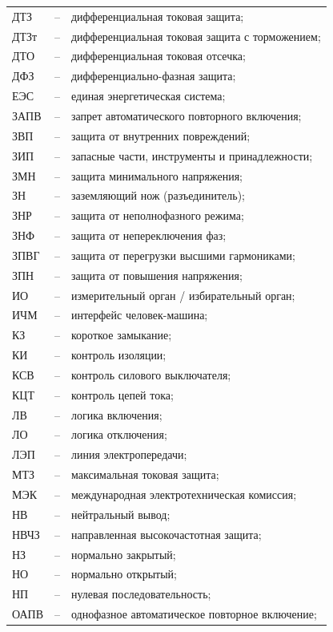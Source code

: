 \begin{longtable}{>{\raggedright\arraybackslash}m{2cm}>{\raggedright\arraybackslash}m{0.5cm}>{\raggedright\arraybackslash}m{20cm}}
ДТЗ & -- & дифференциальная токовая защита; \\
ДТЗт & -- & дифференциальная токовая защита с торможением; \\
ДТО & -- & дифференциальная токовая отсечка; \\
ДФЗ & -- & дифференциально-фазная защита; \\
ЕЭС & -- & единая энергетическая система; \\
ЗАПВ & -- & запрет автоматического повторного включения; \\
ЗВП & -- & защита от внутренних повреждений; \\
ЗИП & -- & запасные части, инструменты и принадлежности; \\
ЗМН & -- & защита минимального напряжения; \\
ЗН & -- & заземляющий нож (разъединитель); \\
ЗНР & -- & защита от неполнофазного режима; \\
ЗНФ & -- & защита от непереключения фаз; \\
ЗПВГ & -- & защита от перегрузки высшими гармониками; \\
ЗПН & -- & защита от повышения напряжения; \\
ИО & -- & измерительный орган / избирательный орган; \\
ИЧМ & -- & интерфейс человек-машина; \\
КЗ & -- & короткое замыкание; \\
КИ & -- & контроль изоляции; \\
КСВ & -- & контроль силового выключателя; \\
КЦТ & -- & контроль цепей тока; \\
ЛВ & -- & логика включения; \\
ЛО & -- & логика отключения; \\
ЛЭП & -- & линия электропередачи; \\
МТЗ & -- & максимальная токовая защита; \\
МЭК & -- & международная электротехническая комиссия; \\
НВ & -- & нейтральный вывод; \\
НВЧЗ & -- & направленная высокочастотная защита; \\
НЗ & -- & нормально закрытый; \\
НО & -- & нормально открытый; \\
НП & -- & нулевая последовательность; \\
ОАПВ & -- & однофазное автоматическое повторное включение; \\

\end{longtable}
